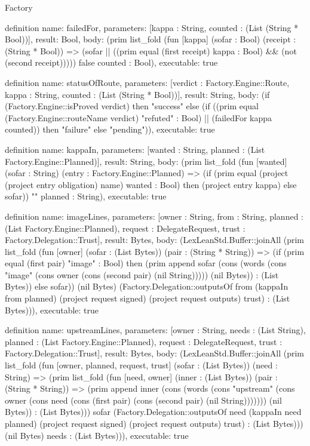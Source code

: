 \begin{lexlean}{Factory}
\begin{semanticmodule}
definition{
  name: failedFor,
  parameters: [kappa : String, counted : (List (String * Bool))],
  result: Bool,
  body: (prim list_fold (fun [kappa] (sofar : Bool) (receipt : (String * Bool)) => (sofar || ((prim equal (first receipt) kappa : Bool) && (not (second receipt))))) false counted : Bool),
  executable: true
}

definition{
  name: statusOfRoute,
  parameters: [verdict : Factory.Engine::Route, kappa : String, counted : (List (String * Bool))],
  result: String,
  body: (if (Factory.Engine::isProved verdict) then "success" else (if ((prim equal (Factory.Engine::routeName verdict) "refuted" : Bool) || (failedFor kappa counted)) then "failure" else "pending")),
  executable: true
}

definition{
  name: kappaIn,
  parameters: [wanted : String, planned : (List Factory.Engine::Planned)],
  result: String,
  body: (prim list_fold (fun [wanted] (sofar : String) (entry : Factory.Engine::Planned) => (if (prim equal (project (project entry obligation) name) wanted : Bool) then (project entry kappa) else sofar)) "" planned : String),
  executable: true
}

definition{
  name: imageLines,
  parameters: [owner : String, from : String, planned : (List Factory.Engine::Planned), request : DelegateRequest, trust : Factory.Delegation::Trust],
  result: Bytes,
  body: (LexLeanStd.Buffer::joinAll (prim list_fold (fun [owner] (sofar : (List Bytes)) (pair : (String * String)) => (if (prim equal (first pair) "image" : Bool) then (prim append sofar (cons (words (cons "image" (cons owner (cons (second pair) (nil String))))) (nil Bytes)) : (List Bytes)) else sofar)) (nil Bytes) (Factory.Delegation::outputsOf from (kappaIn from planned) (project request signed) (project request outputs) trust) : (List Bytes))),
  executable: true
}

definition{
  name: upstreamLines,
  parameters: [owner : String, needs : (List String), planned : (List Factory.Engine::Planned), request : DelegateRequest, trust : Factory.Delegation::Trust],
  result: Bytes,
  body: (LexLeanStd.Buffer::joinAll (prim list_fold (fun [owner, planned, request, trust] (sofar : (List Bytes)) (need : String) => (prim list_fold (fun [need, owner] (inner : (List Bytes)) (pair : (String * String)) => (prim append inner (cons (words (cons "upstream" (cons owner (cons need (cons (first pair) (cons (second pair) (nil String))))))) (nil Bytes)) : (List Bytes))) sofar (Factory.Delegation::outputsOf need (kappaIn need planned) (project request signed) (project request outputs) trust) : (List Bytes))) (nil Bytes) needs : (List Bytes))),
  executable: true
}


\end{semanticmodule}
\end{lexlean}
